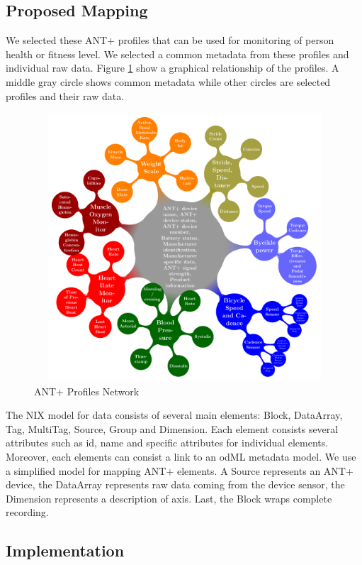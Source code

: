 \documentclass[conference]{IEEEconf}
\begin{document}
\subsection{Proposed Mapping}

We selected these ANT+ profiles that can be used for monitoring of person health or fitness level. We selected a common metadata from these profiles and individual raw data. Figure \ref{AntPlus} show a graphical relationship of the profiles. A middle gray circle shows common metadata while other circles are selected profiles and their raw data. 

\begin{figure}
\centering\includegraphics[width=12cm, height=10cm]{AntPlusProfiles}
\caption{\label{AntPlus}ANT+ Profiles Network}
\end{figure}

The NIX model for data consists of several main elements: Block, DataArray, Tag, MultiTag, Source, Group and Dimension. Each element consists several attributes such as id, name and specific attributes for individual elements. Moreover, each elements can consist a link to an odML metadata model. We use a simplified model for mapping ANT+ elements. A Source represents an ANT+ device, the DataArray represents raw data coming from the device sensor, the Dimension represents a description of axis. Last, the Block wraps complete recording.

\subsection{Implementation}
\end{document}
